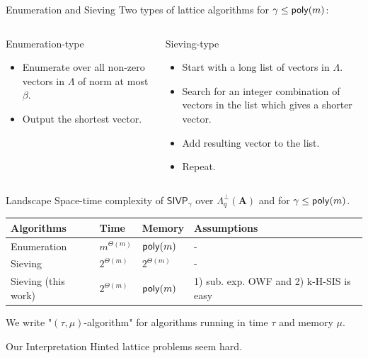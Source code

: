 \documentclass[xcolor=table,10pt,aspectratio=169]{beamer}
\renewcommand{\vec}[1]{\ensuremath{\mathbf{#1}}\xspace}
\providecommand{\mat}[1]{\ensuremath{\vec{#1}}\xspace}
\newcommand{\SIVP}{\ensuremath{\mathsf{SIVP}}\xspace}
\begin{document}
\begin{frame}[label={sec:orgb6dc127}]{Enumeration and Sieving}
Two types of lattice algorithms for \(\gamma \leq \poly[m]\):

\begin{columns}[t]
\begin{column}{0.45\columnwidth}
\begin{alertblock}{Enumeration-type}
\begin{itemize}
\item Enumerate over all non-zero vectors in \(\Lambda\) of norm at most \(\beta\).
\item Output the shortest vector.
\end{itemize}
\end{alertblock}
\end{column}

\begin{column}{0.45\columnwidth}
\begin{alertblock}{Sieving-type}
\begin{itemize}
\item Start with a long list of vectors in \(\Lambda\).
\item Search for an integer combination of vectors in the list which gives a shorter vector.
\item Add resulting vector to the list.
\item Repeat.
\end{itemize}
\end{alertblock}
\end{column}
\end{columns}
\end{frame}

\begin{frame}[label={sec:org0aede65}]{Landscape}
Space-time complexity of \(\SIVP_\gamma\) over \(\Lambda_q^\bot(\mat{A})\) and for \(\gamma \leq \poly[m]\).

\begin{center}
\begin{tabular}{llll}
\toprule
Algorithms & Time & Memory & Assumptions\\[0pt]
\midrule
Enumeration & \(m^{\Theta(m)}\) & \(\poly[m]\) & -\\[0pt]
Sieving & \(2^{\Theta(m)}\) & \(2^{\Theta(m)}\) & -\\[0pt]
Sieving (this work) & \(2^{\Theta(m)}\) & \(\poly[m]\) & 1) sub. exp. OWF and 2) k-H-SIS is easy\\[0pt]
\bottomrule
\end{tabular}

\end{center}

We write "\((\tau,\mu)\)-algorithm" for algorithms running in time \(\tau\) and memory \(\mu\).

\begin{alertblock}{Our Interpretation}
Hinted lattice problems seem hard.
\end{alertblock}
\end{frame}
\end{document}
